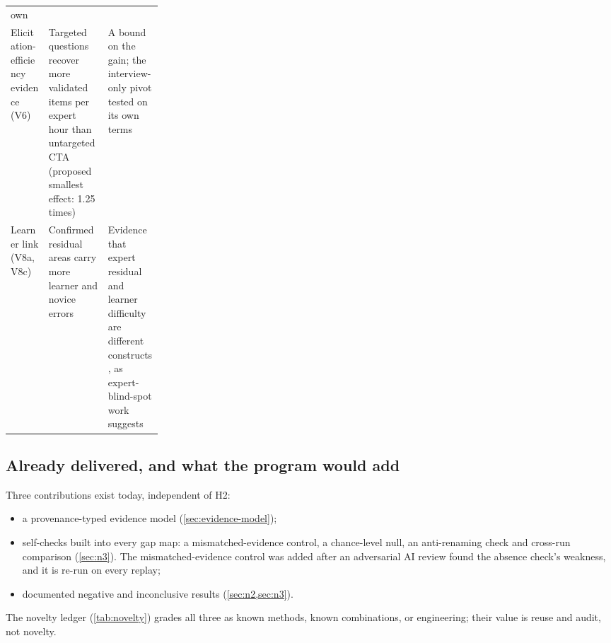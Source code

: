 \begin{table}[!htbp]
\begin{tabularx}{\linewidth}{@{}>{\raggedright\arraybackslash}p{0.25\linewidth}
      >{\raggedright\arraybackslash}X>{\raggedright\arraybackslash}X@{}}
      own \\
    \addlinespace
    Elicitation-efficiency evidence (V6) &
      \evhyp{} Targeted questions recover more validated items per expert hour than untargeted CTA
      (proposed smallest effect: 1.25 times) &
      A bound on the gain; the interview-only pivot tested on its own terms \\
    \addlinespace
    Learner link (V8a, V8c) &
      \evhyp{} Confirmed residual areas carry more learner and novice errors &
      Evidence that expert residual and learner difficulty are different constructs, as
      expert-blind-spot work suggests \parencite{nathan2003expert} \\
    \bottomrule
  \end{tabularx}
\end{table}

\subsection{Already delivered, and what the program would add}

\evobs{} Three contributions exist today, independent of H2:
\begin{itemize}[nosep]
  \item a provenance-typed evidence model (\cref{sec:evidence-model});
  \item self-checks built into every gap map: a mismatched-evidence control, a chance-level null, an anti-renaming
    check and cross-run comparison (\cref{sec:n3}). The mismatched-evidence control was added after an adversarial
    AI review found the absence check's weakness, and it is re-run on every replay;
  \item documented negative and inconclusive results (\cref{sec:n2,sec:n3}).
\end{itemize} \evint{} The novelty ledger
(\cref{tab:novelty}) grades all three as known methods, known combinations, or engineering; their
value is reuse and audit, not novelty.

